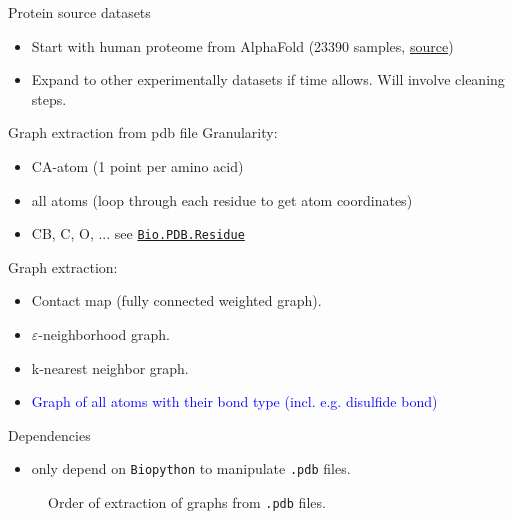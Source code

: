 \documentclass[aspectratio=169, 10pt, dvipsnames, handout]{beamer}
\begin{document}
\begin{frame}[fragile]{Protein source datasets}
  \begin{itemize}
  \item Start with human proteome from AlphaFold (23390 samples,
    \href{https://ftp.ebi.ac.uk/pub/databases/alphafold/latest/UP000005640_9606_HUMAN_v2.tar}{source})
  \item Expand to other experimentally datasets if time allows. Will involve cleaning steps.
  \end{itemize}
\end{frame}

\begin{frame}[fragile]{Graph extraction from pdb file}
  Granularity:
  \begin{itemize}
  \item CA-atom (1 point per amino acid)
  \item all atoms (loop through each residue to get atom coordinates)
  \item CB, C, O, ... see \href{https://biopython.org/docs/1.75/api/Bio.PDB.Residue.html}{\texttt{Bio.PDB.Residue}}
  \end{itemize}
  Graph extraction:
  \begin{itemize}
  \item Contact map (fully connected weighted graph).
  \item $\varepsilon$-neighborhood graph. \cite{anastasiu2016algorithms}
  \item k-nearest neighbor graph. \cite{zhao2021approximate}
  \item \textcolor{blue}{Graph of all atoms with their bond type (incl. e.g. disulfide bond)}

  \end{itemize}

  Dependencies
  \begin{itemize}
  \item only depend on \texttt{Biopython} to manipulate \texttt{.pdb} files.
  \end{itemize}
  \endminipage
  \begin{figure}[center]
    \centering
    \caption{Order of extraction of graphs from \texttt{.pdb} files.}
    \label{fig:overview}
  \end{figure}
  \endminipage

\end{frame}
\end{document}
